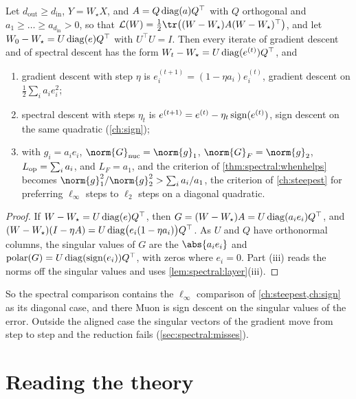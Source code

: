 \begin{refsection}
\begin{proposition}\label{prop:spectral:aligned}
Let $d_{\mathrm{out}}\ge d_{\mathrm{in}}$, $Y=W_\star X$, and $A=Q\operatorname{diag}(a)Q^\top$ with $Q$ orthogonal and $a_1\ge\dots\ge a_{d_{\mathrm{in}}}>0$, so that $\Loss(W)=\frac12\tr\bigl((W-W_\star)A(W-W_\star)^\top\bigr)$, and let $W_0-W_\star=U\operatorname{diag}(e)Q^\top$ with $U^\top U=I$. Then every iterate of gradient descent and of spectral descent has the form $W_t-W_\star=U\operatorname{diag}(e^{(t)})Q^\top$, and
\begin{enumerate}
\item gradient descent with step $\eta$ is $e^{(t+1)}_i=(1-\eta a_i)e^{(t)}_i$, gradient descent on $\frac12\sum_ia_ie_i^2$;
\item spectral descent with steps $\eta_t$ is $e^{(t+1)}=e^{(t)}-\eta_t\operatorname{sign}(e^{(t)})$, sign descent on the same quadratic (\cref{ch:sign});
\item with $g_i=a_ie_i$, $\norm{G}_{\nuc}=\norm{g}_1$, $\norm{G}_F=\norm{g}_2$, $L_{\mathrm{op}}=\sum_ia_i$, and $L_F=a_1$, and the criterion of \cref{thm:spectral:whenhelps} becomes $\norm{g}_1^2/\norm{g}_2^2>\sum_ia_i/a_1$, the criterion of \cref{ch:steepest} for preferring $\ell_\infty$ steps to $\ell_2$ steps on a diagonal quadratic.
\end{enumerate}
\end{proposition}

\begin{proof}
If $W-W_\star=U\operatorname{diag}(e)Q^\top$, then $G=(W-W_\star)A=U\operatorname{diag}(a_ie_i)Q^\top$, and $(W-W_\star)(I-\eta A)=U\operatorname{diag}\bigl(e_i(1-\eta a_i)\bigr)Q^\top$. As $U$ and $Q$ have orthonormal columns, the singular values of $G$ are the $\abs{a_ie_i}$ and $\operatorname{polar}(G)=U\operatorname{diag}(\operatorname{sign}(e_i))Q^\top$, with zeros where $e_i=0$. Part (iii) reads the norms off the singular values and uses \cref{lem:spectral:layer}(iii).
\end{proof}

So the spectral comparison contains the $\ell_\infty$ comparison of \cref{ch:steepest,ch:sign} as its diagonal case, and there Muon is sign descent on the singular values of the error. Outside the aligned case the singular vectors of the gradient move from step to step and the reduction fails (\cref{sec:spectral:misses}).

\section{Reading the theory}\label{sec:spectral:reading}


\end{refsection}
